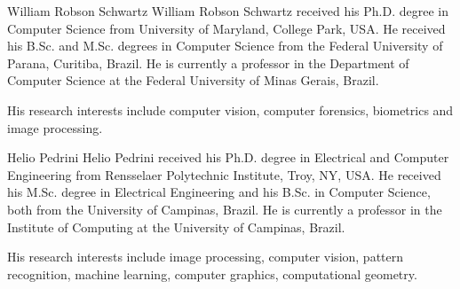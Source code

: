 \documentclass[journal]{IEEEtran}
\begin{document}
\begin{IEEEbiography}{William Robson Schwartz} 
William Robson Schwartz received his Ph.D. degree in Computer Science from University of Maryland, College Park, USA. He received his B.Sc. and M.Sc. degrees in Computer Science from the Federal University of Parana, Curitiba, Brazil.
He is currently a professor in the Department of Computer Science at the Federal University of Minas Gerais, Brazil.

His research interests include computer vision, computer forensics, biometrics and image processing.
\end{IEEEbiography}

\begin{IEEEbiography}{Helio Pedrini} 
Helio Pedrini received his Ph.D. degree in Electrical and Computer Engineering from Rensselaer Polytechnic Institute, Troy, NY, USA. 
He received his M.Sc. degree in Electrical Engineering and his B.Sc. in Computer Science, both from the University of Campinas, Brazil. 
He is currently a professor in the Institute of Computing at the University of Campinas, Brazil. 

His research interests include image processing, computer vision, pattern recognition, machine learning, computer graphics, computational geometry.
\end{IEEEbiography}
\end{document}
